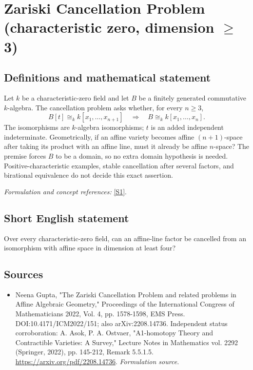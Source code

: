 \documentclass[11pt]{article}
\begin{document}
\section*{\texorpdfstring{Zariski Cancellation Problem (characteristic zero, dimension \ensuremath{\ge} 3)}{Zariski Cancellation Problem (characteristic zero, dimension ≥ 3)}}\label{419}
\subsection{Definitions and mathematical statement}
Let $k$ be a characteristic-zero field and let $B$ be a finitely generated commutative $k$-algebra. The cancellation problem asks whether, for every $n\ge3$,
\[
 B[t]\cong_k k[x_1,\ldots,x_{n+1}]
 \quad\Longrightarrow\quad B\cong_k k[x_1,\ldots,x_n].
\]
The isomorphisms are $k$-algebra isomorphisms; $t$ is an added independent indeterminate. Geometrically, if an affine variety becomes affine $(n+1)$-space after taking its product with an affine line, must it already be affine $n$-space? The premise forces $B$ to be a domain, so no extra domain hypothesis is needed. Positive-characteristic examples, stable cancellation after several factors, and birational equivalence do not decide this exact assertion.
\par\smallskip\textit{Formulation and concept references:} \href{https://arxiv.org/pdf/2208.14736}{[S1]}.

\subsection{Short English statement}
Over every characteristic-zero field, can an affine-line factor be cancelled from an isomorphism with affine space in dimension at least four?
\subsection{Sources}
\begin{itemize}
\item[S1]Neena Gupta, "The Zariski Cancellation Problem and related problems in Affine Algebraic Geometry," Proceedings of the International Congress of Mathematicians 2022, Vol. 4, pp. 1578-1598, EMS Press. DOI:10.4171/ICM2022/151; also arXiv:2208.14736. Independent status corroboration: A. Asok, P. A. Ostvaer, "A1-homotopy Theory and Contractible Varieties: A Survey," Lecture Notes in Mathematics vol. 2292 (Springer, 2022), pp. 145-212, Remark 5.5.1.5.
\url{https://arxiv.org/pdf/2208.14736}.
\textit{Formulation source.}
\end{itemize}
\end{document}
